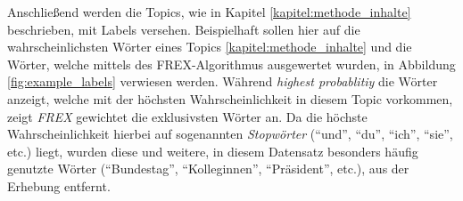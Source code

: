 \documentclass[12pt, 
    twoside=false, 
    bibliography=totoc, 
    numbers=endperiod, 
    headings=normal, 
    toc=chapterentrydotfill
    ]{scrbook}
\begin{document}
Anschließend werden die Topics, wie in Kapitel \ref{kapitel:methode_inhalte} beschrieben, mit Labels versehen. Beispielhaft sollen hier auf die wahrscheinlichsten Wörter eines Topics \ref{kapitel:methode_inhalte} und die Wörter, welche mittels des FREX-Algorithmus ausgewertet wurden, in Abbildung \ref{fig:example_labels} verwiesen werden. Während \emph{highest probablitiy} die Wörter anzeigt, welche mit der höchsten Wahrscheinlichkeit in diesem Topic vorkommen, zeigt \emph{FREX} gewichtet die exklusivsten Wörter an. Da die höchste Wahrscheinlichkeit hierbei auf sogenannten \emph{Stopwörter} (\enquote{und}, \enquote{du}, \enquote{ich}, \enquote{sie}, etc.) liegt, wurden diese und weitere, in diesem Datensatz besonders häufig genutzte Wörter (\enquote{Bundestag}, \enquote{Kolleginnen}, \enquote{Präsident}, etc.), aus der Erhebung entfernt.
\end{document}
